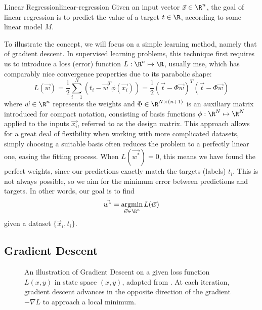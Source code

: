 \begin{definition}{Linear Regression}{linear-regression}
  Given an input vector $\vec{x} \in \R^n$, the goal of linear regression is to predict the value of a target $t \in \R$, according to some linear model $M$.
\end{definition}

To illustrate the concept, we will focus on a simple learning method, namely that of gradient descent.
In supervised learning problems, this technique first requires us to introduce a loss (error) function $L: \R^n \mapsto \R$, usually \gls{mse}, which has comparably nice convergence properties due to its parabolic shape:
$$L(\vec{w}) = \frac{1}{2} \sum_{i=1}^N (t_i - \vec{w}^T \phi(\vec{x_i})) = \frac{1}{2} (\vec{t} - \Phi \vec{w})^T (\vec{t} - \Phi \vec{w})$$
where $\vec{w} \in \R^n$ represents the weights and $\Phi \in \R^{N \times (n+1)}$ is an auxiliary matrix introduced for compact notation, consisting of basis functions $\phi: \R^N \mapsto \R^N$ applied to the inputs $\vec{x_i}$, referred to as the design matrix.
This approach allows for a great deal of flexibility when working with more complicated datasets, simply choosing a suitable basis often reduces the problem to a perfectly linear one, easing the fitting process.
When $L(\vec{w^*}) = 0$, this means we have found the perfect weights, since our predictions exactly match the targets (labels) $t_i$.
This is not always possible, so we aim for the minimum error between predictions and targets.
In other words, our goal is to find
$$\vec{w^*} = \underset{\vec{w} \in \R^n}{\text{argmin}}\, L(\vec{w})$$
given a dataset $\{\vec{x}_i, t_i\}$.

\subsection{Gradient Descent}
\begin{figure}[H]
  \centering
  \caption[Illustration of Gradient Descent]{
    An illustration of Gradient Descent on a given loss function $L(x, y)$ in state space $(x, y)$, adapted from \cite{gradient-descent-plot}.
    At each iteration, gradient descent advances in the opposite direction of the gradient $-\nabla L$ to approach a local minimum.
  }
  \label{fig:gradient-descent}
\end{figure}

